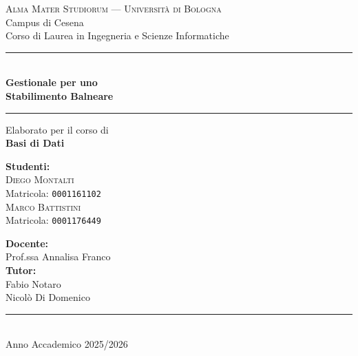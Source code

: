 \begin{titlepage}
  \centering
  \vspace*{1cm}


  {\large\textcolor{primary}{\textsc{Alma Mater Studiorum --- Università di Bologna}}}\\[0.3cm]
  {\large Campus di Cesena}\\[0.2cm]
  {\large Corso di Laurea in Ingegneria e Scienze Informatiche}

  \vspace{1.5cm}
  \rule{\linewidth}{1pt}\\[0.6cm]

  {\Huge\bfseries\color{primary} Gestionale per uno}\\[0.4cm]
  {\Huge\bfseries\color{primary} Stabilimento Balneare}\\[0.6cm]

  \rule{\linewidth}{1pt}

  \vspace{0.8cm}
  {\Large Elaborato per il corso di}\\[0.3cm]
  {\LARGE\bfseries\color{accent} Basi di Dati}

  \vfill

  \begin{minipage}{0.45\textwidth}
    \raggedright
    \textbf{Studenti:}\\[0.3cm]
    \textsc{Diego Montalti}\\
    Matricola: \texttt{0001161102}\\[0.4cm]
    \textsc{Marco Battistini}\\
    Matricola: \texttt{0001176449}
  \end{minipage}
  \hfill
  \begin{minipage}{0.45\textwidth}
    \raggedleft
    \textbf{Docente:}\\[0.1cm]
    Prof.ssa Annalisa Franco \\[0.3cm]

    \textbf{Tutor:}\\[0.1cm]
    Fabio Notaro \\
    Nicol\`{o} Di Domenico
  \end{minipage}

  \vspace{1.5cm}
  \rule{\linewidth}{0.5pt}\\[0.4cm]
  {\large Anno Accademico 2025/2026}

\end{titlepage}

\thispagestyle{empty}
\cleardoublepage
